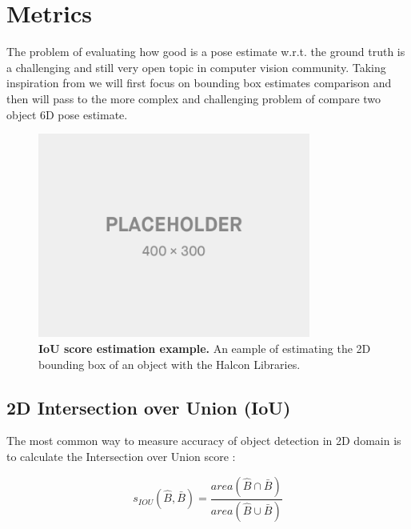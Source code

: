 \section{Metrics}\label{sec:metrics}
The problem of evaluating how good is a pose estimate w.r.t. the ground truth is a challenging and still very open topic in computer vision community.  Taking inspiration from \cite{hodan20166DPoseEstimation} we will first focus on bounding box estimates comparison and then will pass to the more complex and challenging problem of compare two object 6D pose estimate.

\begin{figure}
    \centering
    \includegraphics[width=0.8\textwidth]{figures/2_benchmarks_and_metrics/placeholder800x600}
    \caption{\textbf{IoU score estimation example.} An eample of estimating the 2D bounding box of an object with the Halcon Libraries.} 
    \label{fig:iou_example}
\end{figure}

\subsection{2D Intersection over Union (IoU)}\label{subsec:iou}
The most common way to measure accuracy of object detection in 2D domain is to calculate the Intersection over Union score \cite{everingham2015challenge}:

\begin{equation}
    \label{eq:iou_score}
    s_{IOU}(\hat{B}, \bar{B}) = \dfrac{area(\hat{B} \cap \bar{B})}{area(\hat{B} \cup \bar{B})}
\end{equation}

